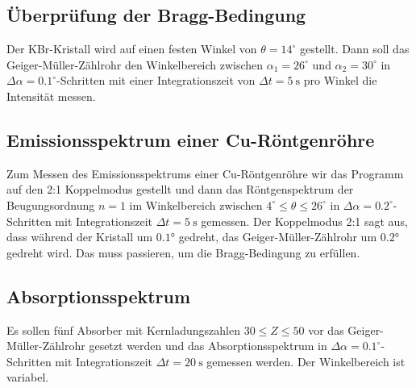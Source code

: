 \subsection{Überprüfung der Bragg-Bedingung}
Der KBr-Kristall wird auf einen festen Winkel von $\theta=14^{\circ}$ gestellt. Dann soll das Geiger-Müller-Zählrohr den Winkelbereich zwischen $\alpha_{1}=26^{\circ}$ und $\alpha_{2}=30^{\circ}$ in $\Delta\alpha=0.1^{\circ}$-Schritten mit einer Integrationszeit von $\Delta t=5\ \si{\s}$ pro Winkel die Intensität messen.

\subsection{Emissionsspektrum einer Cu-Röntgenröhre}
Zum Messen des Emissionsspektrums einer Cu-Röntgenröhre wir das Programm auf den 2:1 Koppelmodus gestellt und dann das Röntgenspektrum der Beugungsordnung $n=1$ im Winkelbereich zwischen $4^{\circ}\leq\theta\leq 26^{\circ}$ in $\Delta\alpha=0.2^{\circ}$-Schritten mit Integrationszeit $\Delta t=5\ \si{\s}$ gemessen. Der Koppelmodus 2:1 sagt aus, dass während der Kristall um $0.1$° gedreht, das Geiger-Müller-Zählrohr um $0.2$° gedreht wird. Das muss passieren, um die Bragg-Bedingung zu erfüllen. 

\subsection{Absorptionsspektrum}
Es sollen fünf Absorber mit Kernladungszahlen $30\leq Z\leq 50$ vor das Geiger-Müller-Zählrohr gesetzt werden und das Absorptionsspektrum in $\Delta\alpha=0.1^{\circ}$-Schritten mit Integrationszeit $\Delta t=20\ \si{\s}$ gemessen werden. Der Winkelbereich ist variabel.

